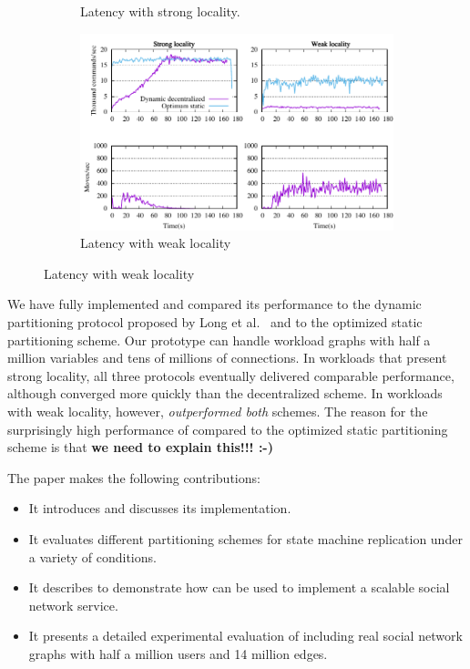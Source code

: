 \begin{figure}[t]
\begin{subfigure}[b]{0.45\textwidth}
    \caption{Latency with strong locality.}
  \end{subfigure}
  \begin{subfigure}[b]{0.45\textwidth}
    \centering
    \includegraphics[width=0.95\columnwidth]{figures/motivation}
    \caption{Latency with weak locality}
  \end{subfigure} 
\end{figure}




\smallskip


We have fully implemented \dynastar and compared its performance to
the dynamic partitioning protocol proposed by Long et
al.~\cite{hoang2016} and to the optimized static partitioning scheme.
Our prototype can handle workload graphs with half a million variables
and tens of millions of connections.  In workloads that present strong
locality, all three protocols eventually delivered comparable
performance, although \dynastar converged more quickly than the
decentralized scheme.  In workloads with weak locality, however,
\dynastar \emph{outperformed both} schemes.  The reason for the
surprisingly high performance of \dynastar compared to the optimized
static partitioning scheme is that \textbf{we need to explain this!!!
  :-)}  

The paper makes the following contributions:
\begin{itemize}
\item It introduces \dynastar and discusses its implementation. 
\item It evaluates different partitioning schemes for state machine replication under a variety of conditions.
\item It describes \appname{} to demonstrate how \libname{} can be used to implement a scalable social network service.
\item It presents a detailed experimental evaluation of \dynastar including real social network graphs with half a million users and 14 million edges.
\end{itemize}

